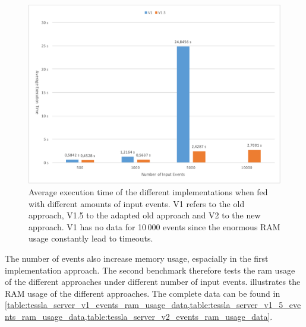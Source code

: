 \begin{figure}
  \includegraphics[angle=90,origin=c,width=\textwidth]{gfx/runtime_num_events_benchmark}
  \caption[Average execution time of the different implementations when fed with different amounts of input events.]{Average execution time of the different implementations when fed with different amounts of input events. V1 refers to the old approach, V1.5 to the adapted old approach and V2 to the new approach. V1 has no data for 10\,000 events since the enormous RAM usage constantly lead to timeouts.}
\label{fig:chap_eval:runtime_num_events}
\end{figure}

The number of events also increase memory usage, espacially in the first implementation approach.
The second benchmark therefore tests the ram usage of the different approaches under different number of input events.
 illustrates the RAM usage of the different approaches.
The complete data can be found in \cref{table:tessla_server_v1_events_ram_usage_data,table:tessla_server_v1_5_events_ram_usage_data,table:tessla_server_v2_events_ram_usage_data}.

